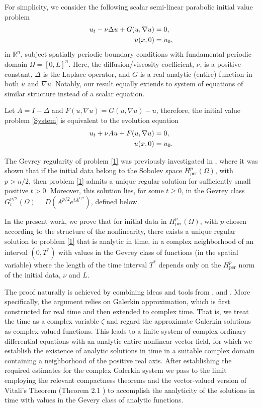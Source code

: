 \documentclass[12pt]{article}
\theoremstyle{plain}
\theoremstyle{remark}
\newcommand{\Hper}{H_{\mathrm{per}}}
\begin{document}
For simplicity, we  consider the following scalar semi-linear parabolic initial value problem 
\begin{align}
u_t - \nu\Delta u + G(u,\nabla u) &= 0,\label{System}\\\quad 
    u(x,0)&=u_0,\notag
\end{align}
in  $\mathbb{R}^n$, subject spatially periodic boundary conditions with fundamental periodic domain \(\Omega=[0, L]^n\). Here, the diffusion/viscosity coefficient, $\nu$, is a positive constant, $\Delta$ is the Laplace operator, and $G$ is a real analytic (entire)  function in both $u$ and $\nabla u$. Notably, our result equally extends to system of equations of similar structure instead of a scalar equation.

Let \( A = I - \Delta \) and \( F(u,\nabla u)= G(u,\nabla u)-u\), therefore, the initial value problem \eqref{System} is equivalent to the evolution equation
\begin{align}
    u_t + \nu Au +  F(u,\nabla u) &= 0,\label{1}\\\quad  
      u(x,0) &= u_0.\notag
\end{align}

The Gevrey regularity of problem \eqref{1} was previously investigated in  \cite{FerrariTiti1998}, where it was shown that if the initial data belong to the Sobolev space $\Hper^p(\Omega)$, with $p> n/2$, then problem \eqref{1} admits a unique regular solution for sufficiently small positive $t>0$. Moreover, this solution lies, for some $t \ge 0$, in the Gevrey class $G_{t}^{p/2}(\Omega)=D(A^{p/2}e^{t A^{1/2}})$, defined below.

In the present work, we prove that for initial data in $\Hper ^p (\Omega)$, with  $p$ chosen according to the structure of the nonlinearity, there exists a unique regular solution to problem \eqref{1} that is analytic in time, in a complex neighborhood of an interval $(0,T^*)$ with values in the Gevrey class of functions (in the spatial variable) where the length of the time interval $T^*$ depends only on the  $\Hper^p$ norm of the initial data, $\nu$ and $L$. 

The proof naturally is achieved by combining ideas and tools from \cite{FerrariTiti1998}, \cite{FoiasTemam1979} and \cite{FoiasTemam1989}. More specifically, the argument relies on Galerkin approximation, which is first constructed for real time and then extended to complex time. That is, we treat the time  as a complex variable $\zeta$ and regard the approximate Galerkin solutions as complex-valued functions. This leads to a finite system of complex ordinary differential equations with an analytic entire nonlinear vector field, for which we establish the existence of analytic solutions in time in a suitable complex domain containing a neighborhood of the positive real axis. After establishing the required estimates for the complex Galerkin system we pass to the limit employing the relevant compactness theorems and the vector-valued version of Vitali’s Theorem (Theorem 2.1 \cite{arendt_nikolski_2000}) to accomplish the analyticity of the solutions in time with values in the Gevery class of analytic functions. 
\end{document}
